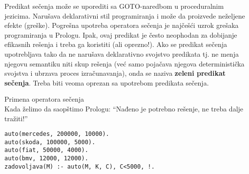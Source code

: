\documentclass[../main.tex]{subfiles}
\begin{document}
\begin{boxprimer}
\begin{example}
{%
}
\end{example}
\end{boxprimer}

Predikat sečenja može se uporediti sa GOTO-naredbom u proceduralnim jezicima. Narušava deklarativni stil programiranja i može da proizvede neželjene efekte (greške). Pogrešna upotreba operatora sečenja je najčešći uzrok grešaka programiranja u Prologu. Ipak, ovaj predikat je često neophodan za dobijanje efikasnih rešenja i treba ga koristiti (ali oprezno!). Ako se predikat sečenja upotrebljava tako da ne narušava deklarativno svojstvo predikata tj. ne menja njegovu semantiku niti skup rešenja (već samo pojačava njegova deterministička svojstva i ubrzava proces izračunavanja), onda se naziva {\bf zeleni predikat sečenja}. Treba biti veoma oprezan sa upotrebom predikata sečenja.

\begin{boxprimer}
\begin{example}
Primena operatora sečenja\\
Kada želimo da saopštimo Prologu: ``Nađeno je potrebno rešenje, ne treba dalje tražiti!''
\begin{Verbatim}
auto(mercedes, 200000, 10000).
auto(skoda, 100000, 5000).
auto(fiat, 50000, 4000).
auto(bmv, 12000, 12000).
zadovoljava(M) :- auto(M, K, C), C<5000, !.
\end{Verbatim}
\end{example}
\end{boxprimer} 
\end{document}
